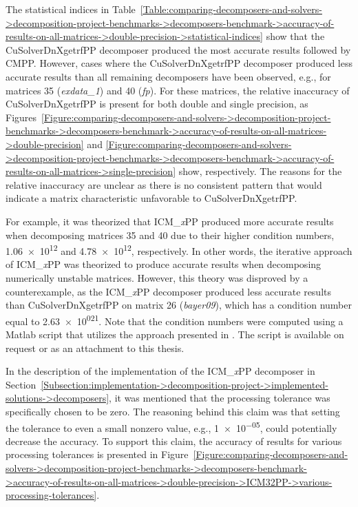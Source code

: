 The statistical indices in Table~\ref{Table:comparing-decomposers-and-solvers->decomposition-project-benchmarks->decomposers-benchmark->accuracy-of-results-on-all-matrices->double-precision->statistical-indices} show that the CuSolverDnXgetrfPP decomposer produced the most accurate results followed by CMPP.
However, cases where the CuSolverDnXgetrfPP decomposer produced less accurate results than all remaining decomposers have been observed, e.g., for matrices 35 (\textit{exdata\_1}) and 40 (\textit{fp}).
For these matrices, the relative inaccuracy of CuSolverDnXgetrfPP is present for both double and single precision, as Figures~\ref{Figure:comparing-decomposers-and-solvers->decomposition-project-benchmarks->decomposers-benchmark->accuracy-of-results-on-all-matrices->double-precision} and \ref{Figure:comparing-decomposers-and-solvers->decomposition-project-benchmarks->decomposers-benchmark->accuracy-of-results-on-all-matrices->single-precision} show, respectively.
The reasons for the relative inaccuracy are unclear as there is no consistent pattern that would indicate a matrix characteristic unfavorable to CuSolverDnXgetrfPP.

For example, it was theorized that ICM\_\textit{x}PP produced more accurate results when decomposing matrices 35 and 40 due to their higher condition numbers, \num{1.06e+12} and \num{4.78e+12}, respectively.
In other words, the iterative approach of ICM\_\textit{x}PP was theorized to produce accurate results when decomposing numerically unstable matrices.
However, this theory was disproved by a counterexample, as the ICM\_\textit{x}PP decomposer produced less accurate results than CuSolverDnXgetrfPP on matrix 26 (\textit{bayer09}), which has a condition number equal to \num{2.63e+021}.
Note that the condition numbers were computed using a Matlab script that utilizes the approach presented in  \cite{Davis2010, Amestoy1996, Amestoy2004}.
The script is available on request or as an attachment to this thesis.

In the description of the implementation of the ICM\_\textit{x}PP decomposer in Section~\ref{Subsection:implementation->decomposition-project->implemented-solutions->decomposers}, it was mentioned that the processing tolerance was specifically chosen to be zero.
The reasoning behind this claim was that setting the tolerance to even a small nonzero value, e.g., \num{1e-05}, could potentially decrease the accuracy.
To support this claim, the accuracy of results for various processing tolerances is presented in Figure~\ref{Figure:comparing-decomposers-and-solvers->decomposition-project-benchmarks->decomposers-benchmark->accuracy-of-results-on-all-matrices->double-precision->ICM32PP->various-processing-tolerances}.

